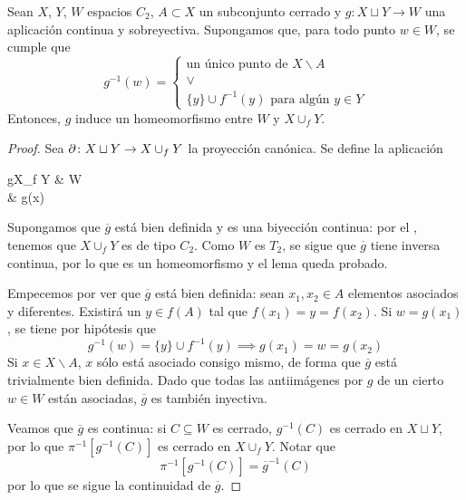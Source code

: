 \begin{lemma}
Sean $X$, $Y$, $W$ espacios $C_2$, $A \subset X$ un subconjunto cerrado y
$g\colon X\sqcup Y \to W$ una aplicación continua y sobreyectiva. Supongamos
que, para todo punto $w \in W$, se cumple que
\[g^{-1}(w)=\left\{
\begin{array}{c}
\text{un único punto de $X\backslash A$}\\
\lor\\
\text{$\{y\}\cup f^{-1}(y)$ para algún $y \in Y$}
\end{array}
\right.\]
Entonces, $g$ induce un homeomorfismo entre $W$ y $X \cup_f Y$.
\end{lemma}

\begin{proof}
Sea $\partial\colon X\sqcup Y \to X \cup_f Y$ la proyección canónica. Se define la
aplicación
\begin{diag}
\overline g\colon X\cup_f Y \arrow[r]& W\\[-8mm]
\left[x\right] \arrow[maps to, r] & g(x)
\end{diag}


Supongamos que $\overline g$ está bien definida y es una biyección continua:
por el , tenemos que $X\cup_f Y$ es de tipo $C_2$. Como $W$ es
$T_2$, se sigue que $\overline g$ tiene inversa continua, por lo que es un
homeomorfismo y el lema queda probado.

Empecemos por ver que $\overline{g}$ está bien definida: sean $x_1, x_2 \in
A$ elementos asociados y diferentes. Existirá un $y \in f(A)$ tal que $f(x_1)=
y=f(x_2)$. Si $w=g(x_1)$, se tiene por hipótesis que
\[g^{-1}(w)=\{y\}\cup f^{-1}(y) \implies g(x_1)=w=g(x_2)\]
Si $x \in X\backslash A$, $x$ sólo está asociado consigo mismo, de forma que
$\overline{g}$ está trivialmente bien definida. Dado que todas las
antiimágenes por $g$ de un cierto $w \in W$ están asociadas, $\overline{g}$ es
también inyectiva.

Veamos que $\overline{g}$ es continua: si $C \subseteq W$ es cerrado,
$g^{-1}(C)$ es cerrado en $X\sqcup Y$, por lo que $\pi^{-1}[g^{-1}(C)]$ es
cerrado en $X\cup_f Y$. Notar que
\[\pi^{-1}[g^{-1}(C)]=\overline{g}^{-1}(C)\]
por lo que se sigue la continuidad de $\overline{g}$.
\end{proof}

